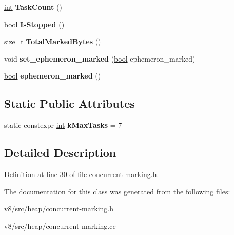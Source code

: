 \begin{DoxyCompactItemize}
\item 
\mbox{\label{classv8_1_1internal_1_1ConcurrentMarking_a07226969a224e92213fbce986508c2a5}} 
\mbox{\hyperlink{classint}{int}} {\bfseries Task\+Count} ()
\item 
\mbox{\label{classv8_1_1internal_1_1ConcurrentMarking_a06980681d462120291c2047124cd6a3a}} 
\mbox{\hyperlink{classbool}{bool}} {\bfseries Is\+Stopped} ()
\item 
\mbox{\label{classv8_1_1internal_1_1ConcurrentMarking_a31d998afac0de0ac1d99011985247e9a}} 
\mbox{\hyperlink{classsize__t}{size\+\_\+t}} {\bfseries Total\+Marked\+Bytes} ()
\item 
\mbox{\label{classv8_1_1internal_1_1ConcurrentMarking_a6c4bbd33065693cc4f40a171e67934e1}} 
void {\bfseries set\+\_\+ephemeron\+\_\+marked} (\mbox{\hyperlink{classbool}{bool}} ephemeron\+\_\+marked)
\item 
\mbox{\label{classv8_1_1internal_1_1ConcurrentMarking_af0389265b9b869b24650848a3fe4a0e5}} 
\mbox{\hyperlink{classbool}{bool}} {\bfseries ephemeron\+\_\+marked} ()
\end{DoxyCompactItemize}
\subsection*{Static Public Attributes}
\begin{DoxyCompactItemize}
\item 
\mbox{\label{classv8_1_1internal_1_1ConcurrentMarking_a9306d2a237d4cc2ed7fb19d1d3680269}} 
static constexpr \mbox{\hyperlink{classint}{int}} {\bfseries k\+Max\+Tasks} = 7
\end{DoxyCompactItemize}


\subsection{Detailed Description}


Definition at line 30 of file concurrent-\/marking.\+h.



The documentation for this class was generated from the following files\+:\begin{DoxyCompactItemize}
\item 
v8/src/heap/concurrent-\/marking.\+h\item 
v8/src/heap/concurrent-\/marking.\+cc\end{DoxyCompactItemize}
